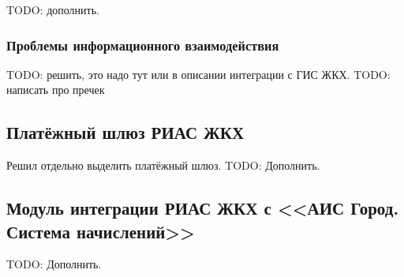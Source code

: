 

TODO: дополнить.

\subsubsection{Проблемы информационного взаимодействия}

TODO: решить, это надо тут или в описании интеграции с ГИС ЖКХ.
TODO: написать про пречек

\subsection{Платёжный шлюз РИАС ЖКХ}

Решил отдельно выделить платёжный шлюз.
TODO: Дополнить.

\subsection{Модуль интеграции РИАС ЖКХ с <<АИС Город. Система начислений>>}

TODO: Дополнить.

\clearpage
\newpage